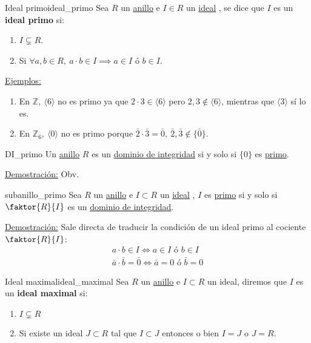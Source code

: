 \documentclass[10pt, a4paper]{article}
\newcommand{\Z}{\mathbb{Z}}
\newcommand{\ejs}{\underline{Ejemplos:} }
\newcommand{\demo}{\underline{Demostración:} }
\newcommand{\anillo}[1][]{\hyperref[def:anillo]{anillo}#1 }
\newcommand{\ideal}[1][]{\hyperref[def:ideal]{ideal}#1 }
\newenvironment{enumerater}{\begin{enumerate}[label=\roman*)]}
{\end{enumerate}}
\newenvironment{enumeratea}{\begin{enumerate}[label=\arabic*)]}
{\end{enumerate}}
\begin{document}
\vspace{3mm}

\begin{definition}{Ideal primo}{ideal_primo}
Sea $R$ un \anillo e $I \in R$ un \ideal, se dice que $I$ es un \textbf{ideal primo} si:
\begin{enumerater}
	\item $I \subsetneq R$.
	\item Si $\forall a,b \in R,\ a \cdot b \in I \implies a \in I \text{ ó } b \in I$.
\end{enumerater}
\end{definition}

\ejs
\begin{enumeratea}
	\item En $\Z,\ \langle 6 \rangle$ no es primo ya que $2 \cdot 3 \in \langle 6 \rangle$ pero $2,3 \notin \langle 6 \rangle$, mientras que $\langle 3 \rangle$ sí lo es.
	\item En $\Z_6,\ \langle 0 \rangle$ no es primo porque $\bar{2} \cdot \bar{3} = \bar{0},\ \bar{2}, \bar{3} \notin \{\bar{0}\}$.
\end{enumeratea}

\begin{proposition}{}{DI_primo}
Un \anillo $R$ es un \hyperref[def:DI]{dominio de integridad} si y solo si $\{0\}$ es \hyperref[def:ideal_primo]{primo}.
\end{proposition}

\demo Obv.

\begin{proposition}{}{subanillo_primo}
Sea $R$ un \anillo e $I \subset R$ un \ideal, $I$ es \hyperref[def:ideal_primo]{primo} si y solo si $\faktor{R}{I}$ es un \hyperref[def:DI]{dominio de integridad}.
\end{proposition}

\demo Sale directa de traducir la condición de un ideal primo al cociente $\faktor{R}{I}$:
\[
\begin{array}{c}
	a \cdot b \in I \iff a \in I \text{ ó } b \in I \\
	\bar{a} \cdot \bar{b} = \bar{0} \iff \bar{a} = 0 \text{ ó } \bar{b} = 0
\end{array}
\]

\begin{definition}{Ideal maximal}{ideal_maximal}
Sea $R$ un \anillo e $I \subset R$ un ideal, diremos que $I$ es un \textbf{ideal maximal} si:
\begin{enumerater}
	\item $I \subsetneq R$
	\item Si existe un ideal $J \subset R$ tal que $I \subset J$ entonces o bien $I = J$ o $J = R$.
\end{enumerater}
\end{definition}
\end{document}
